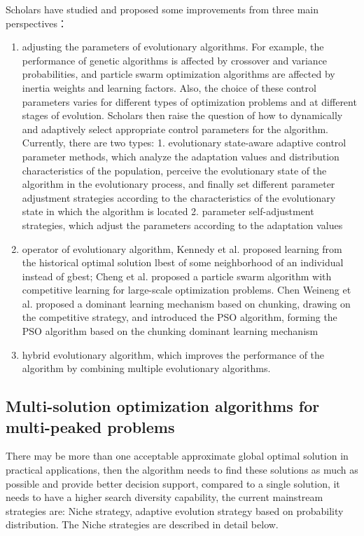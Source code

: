 \documentclass[twocolumn]{article}
\begin{document}
Scholars have studied and proposed some improvements from three main
perspectives：

\begin{enumerate}
	\def\labelenumi{\arabic{enumi}.}
	\item
	adjusting the parameters of evolutionary algorithms. For example, the
	performance of genetic algorithms is affected by crossover and
	variance probabilities, and particle swarm optimization algorithms are
	affected by inertia weights and learning factors. Also, the choice of
	these control parameters varies for different types of optimization
	problems and at different stages of evolution. Scholars then raise the
	question of how to dynamically and adaptively select appropriate
	control parameters for the algorithm. Currently, there are two types:
	1. evolutionary state-aware adaptive control parameter methods, which
	analyze the adaptation values and distribution characteristics of the
	population, perceive the evolutionary state of the algorithm in the
	evolutionary process, and finally set different parameter adjustment
	strategies according to the characteristics of the evolutionary state
	in which the algorithm is located 2. parameter self-adjustment
	strategies, which adjust the parameters according to the adaptation
	values
	\item
	operator of evolutionary algorithm, Kennedy et al. proposed learning
	from the historical optimal solution lbest of some neighborhood of an
	individual instead of gbest; Cheng et al. proposed a particle swarm
	algorithm with competitive learning for large-scale optimization
	problems. Chen Weineng et al. proposed a dominant learning mechanism
	based on chunking, drawing on the competitive strategy, and introduced
	the PSO algorithm, forming the PSO algorithm based on the chunking
	dominant learning mechanism
	\item
	hybrid evolutionary algorithm, which improves the performance of the
	algorithm by combining multiple evolutionary algorithms.
\end{enumerate}

\subsection{Multi-solution optimization algorithms for multi-peaked problems}

There may be more than one acceptable approximate global optimal
solution in practical applications, then the algorithm needs to find
these solutions as much as possible and provide better decision support,
compared to a single solution, it needs to have a higher search
diversity capability, the current mainstream strategies are: Niche
strategy, adaptive evolution strategy based on probability distribution.
The Niche strategies are described in detail below.
\end{document}
